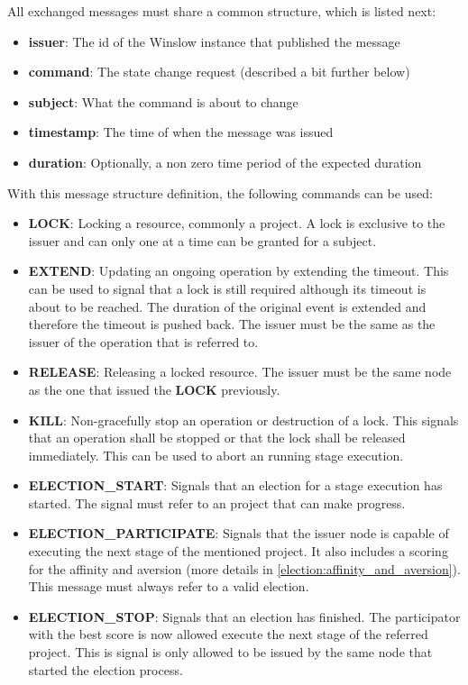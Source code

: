 All exchanged messages must share a common structure, which is listed next:

\begin{itemize}
	\item \textbf{issuer}: The id of the Winslow instance that published the message
	\item \textbf{command}: The state change request (described a bit further below)
	\item \textbf{subject}: What the command is about to change
	\item \textbf{timestamp}: The time of when the message was issued
	\item \textbf{duration}: Optionally, a non zero time period of the expected duration
\end{itemize}

With this message structure definition, the following commands can be used:

\begin{itemize}
	\item \textbf{LOCK}: Locking a resource, commonly a project.
	A lock is exclusive to the issuer and can only one at a time can be granted for a subject.
	\item \label{message:extend} \textbf{EXTEND}: Updating an ongoing operation by extending the timeout.
	This can be used to signal that a lock is still required although its timeout is about to be reached.
	The duration of the original event is extended and therefore the timeout is pushed back.
	The issuer must be the same as the issuer of the operation that is referred to.
	\item \textbf{RELEASE}: Releasing a locked resource.
	The issuer must be the same node as the one that issued the \textbf{LOCK} previously.
	\item \textbf{KILL}: Non-gracefully stop an operation or destruction of a lock.
	This signals that an operation shall be stopped or that the lock shall be released immediately.
	This can be used to abort an running stage execution.
	\item \textbf{ELECTION\_START}: Signals that an election for a stage execution has started.
	The signal must refer to an project that can make progress.
	\item \textbf{ELECTION\_PARTICIPATE}: Signals that the issuer node is capable of executing the next stage of the mentioned project.
	It also includes a scoring for the affinity and aversion (more details in \autoref{election:affinity_and_aversion}).
	This message must always refer to a valid election.
	\item \textbf{ELECTION\_STOP}: Signals that an election has finished.
	The participator with the best score is now allowed execute the next stage of the referred project.
	This is signal is only allowed to be issued by the same node that started the election process.
\end{itemize}

